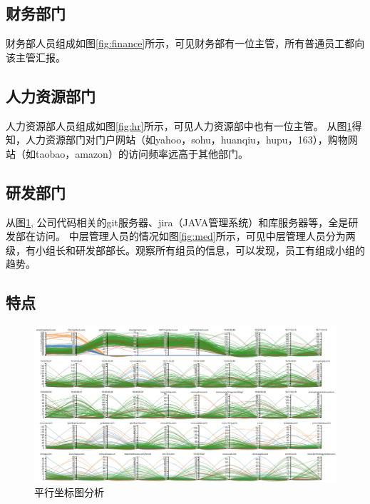 \documentclass[journal]{vgtc}                %
\begin{document}
\subsection{财务部门}
财务部人员组成如图\ref{fig:finance}所示，可见财务部有一位主管，所有普通员工都向该主管汇报。

\subsection{人力资源部门}
人力资源部人员组成如图\ref{fig:hr}所示，可见人力资源部中也有一位主管。
从图\ref{fig:parrell}得知，人力资源部门对门户网站（如yahoo，sohu，huanqiu，hupu，163），购物网站（如taobao，amazon）的访问频率远高于其他部门。
\subsection{研发部门}
从图\ref{fig:parrell}, 公司代码相关的git服务器、jira（JAVA管理系统）和库服务器等，全是研发部在访问。
中层管理人员的情况如图\ref{fig:med}所示，可见中层管理人员分为两级，有小组长和研发部部长。观察所有组员的信息，可以发现，员工有组成小组的趋势。
\subsection{特点}
\begin{figure}
\includegraphics[width=\linewidth]{pictures/6.png}
\caption{平行坐标图分析}
\label{fig:parrell}
\end{figure}

%
%
%
%
%

%
\end{document}
